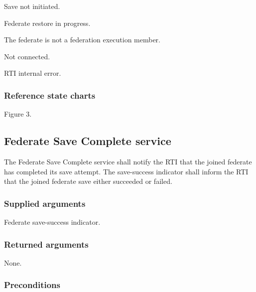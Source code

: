 \begin{stdalphalist}
    \item Save not initiated.
    \item Federate restore in progress.
    \item The federate is not a federation execution member.
    \item Not connected.
    \item RTI internal error.
\end{stdalphalist}

\subsubsection{Reference state charts}

\begin{stdalphalist}
    \item Figure 3.
\end{stdalphalist}

\clearpage


\subsection{Federate Save Complete service}

The Federate Save Complete service shall notify the RTI that the joined federate has completed its save attempt. The save-success indicator shall inform the RTI that the joined federate save either succeeded or failed.

\subsubsection{Supplied arguments}

\begin{stdalphalist}
    \item Federate save-success indicator.
\end{stdalphalist}

\subsubsection{Returned arguments}

\begin{stdalphalist}
    \item None.
\end{stdalphalist}

\subsubsection{Preconditions}

